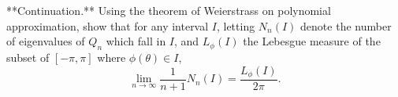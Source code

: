**Continuation.** Using the theorem of Weierstrass on polynomial approximation, show that for any interval \(I\), letting \(N_n(I)\) denote the number of eigenvalues of \(Q_n\) which fall in \(I\), and \(L_\phi(I)\) the Lebesgue measure of the subset of \([-\pi,\pi]\) where \(\phi(\theta) \in I\),
\[
\lim_{n \to \infty} \frac{1}{n+1} N_n(I) = \frac{L_\phi(I)}{2\pi}.
\]
